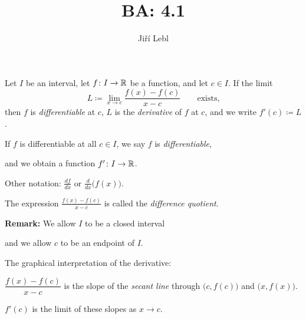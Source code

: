\documentclass[10pt,aspectratio=149]{beamer}
\author{Ji\v{r}\'i Lebl}
\institute[OSU]{%
Departemento pri Matematiko de Oklahoma {\^S}tata Universitato}
\title{BA: 4.1}
\date{}
\begin{document}
\begin{frame}
\titlepage
\end{frame}

\begin{frame}
\begin{definition}
Let $I$ be an interval, let
$f \colon I \to {\mathbb{R}}$ be a function, and let $c \in I$.
\pause
If the limit
\begin{equation*}
L \coloneqq \lim_{x \to c} \frac{f(x)-f(c)}{x-c} \qquad \text{exists,}
\end{equation*}
\pause
then $f$ is
\emph{differentiable} at
$c$, $L$ is the \emph{derivative} of $f$ at $c$,
and we write $f'(c) \coloneqq L$.

\pause
\medskip

If $f$ is differentiable at all $c \in I$, we say
$f$ is \emph{differentiable},

and we obtain a function $f' \colon I \to {\mathbb{R}}$.

\pause
\medskip

Other notation: $\frac{df}{dx}$ or $\frac{d}{dx}\bigl( f(x) \bigr)$.

\pause
\medskip

The expression $\frac{f(x)-f(c)}{x-c}$ is called the
\emph{difference quotient}.
\end{definition}

\pause
\textbf{Remark:}
We allow $I$ to be a closed interval

and we allow $c$ to be an endpoint of $I$.

\end{frame}

\begin{frame}
The graphical interpretation of the derivative:

\medskip

\begin{center}
\end{center}

\pause
\medskip

$\dfrac{f(x)-f(c)}{x-c}$ is the slope of the \emph{secant line}
through $\bigl(c,f(c)\bigr)$ and $\bigl(x,f(x)\bigr)$.

\pause
\medskip

$f'(c)$ is the limit of these slopes as $x \to c$.

\end{frame}
\end{document}
